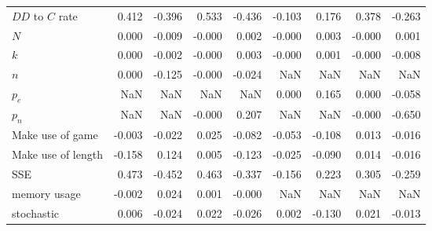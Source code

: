 \begin{tabular}{lrrrrrrrr}
$DD$ to $C$ rate     &            0.412 &        -0.396 &            0.533 &        -0.436 &           -0.103 &         0.176 &            0.378 &        -0.263 \\
$N$                  &            0.000 &        -0.009 &           -0.000 &         0.002 &           -0.000 &         0.003 &           -0.000 &         0.001 \\
$k$                  &            0.000 &        -0.002 &           -0.000 &         0.003 &           -0.000 &         0.001 &           -0.000 &        -0.008 \\
$n$                  &            0.000 &        -0.125 &           -0.000 &        -0.024 &              NaN &           NaN &              NaN &           NaN \\
$p_e$                &              NaN &           NaN &              NaN &           NaN &            0.000 &         0.165 &            0.000 &        -0.058 \\
$p_n$                &              NaN &           NaN &           -0.000 &         0.207 &              NaN &           NaN &           -0.000 &        -0.650 \\
Make use of game     &           -0.003 &        -0.022 &            0.025 &        -0.082 &           -0.053 &        -0.108 &            0.013 &        -0.016 \\
Make use of length   &           -0.158 &         0.124 &            0.005 &        -0.123 &           -0.025 &        -0.090 &            0.014 &        -0.016 \\
SSE                  &            0.473 &        -0.452 &            0.463 &        -0.337 &           -0.156 &         0.223 &            0.305 &        -0.259 \\
memory usage         &           -0.002 &         0.024 &            0.001 &        -0.000 &              NaN &           NaN &              NaN &           NaN \\
stochastic           &            0.006 &        -0.024 &            0.022 &        -0.026 &            0.002 &        -0.130 &            0.021 &        -0.013 \\
\bottomrule
\end{tabular}
